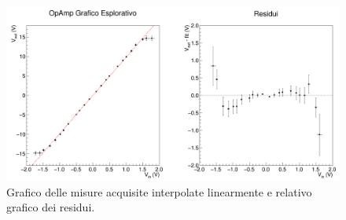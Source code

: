 \documentclass[a4paper,11pt]{article} %
\begin{document}
%		
%		
%		

\begin{figure}[H]
	\centering
	\includegraphics[width=\linewidth]{../Plots/Report_Plots/opamp_plot_alldata_eda.png}
	\caption{\small Grafico delle misure acquisite interpolate linearmente e relativo grafico dei residui.}
	\label{i:opamp_eda}
\end{figure}
\end{document}
